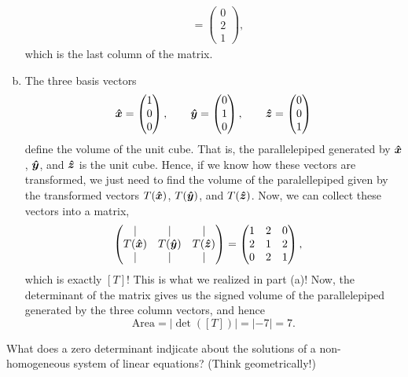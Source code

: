 \documentclass[12pt]{article} %
\begin{document}
\begin{solution}
\begin{enumerate}[(a)]
\begin{align*}
&= \begin{pmatrix} 0 \\ 2 \\ 1 \end{pmatrix},
    \end{align*}
    which is the last column of the matrix.
    \item The three basis vectors 
    \[
    \boldsymbol{\hat{x}} = \begin{pmatrix} 1 \\ 0 \\ 0 \end{pmatrix}, \qquad \boldsymbol{\hat{y}} = \begin{pmatrix} 0 \\ 1 \\ 0 \end{pmatrix}, \qquad \boldsymbol{\hat{z}} =\begin{pmatrix} 0 \\ 0 \\ 1 \end{pmatrix}
    \]
    define the volume of the unit cube. That is, the parallelepiped generated by $\boldsymbol{\hat{x}}$, $\boldsymbol{\hat{y}}$, and $\boldsymbol{\hat{z}}$ is the unit cube. Hence, if we know how these vectors are transformed, we just need to find the volume of the paralellepiped given by the transformed vectors $T(\boldsymbol{\hat{x}})$, $T(\boldsymbol{\hat{y}})$, and $T(\boldsymbol{\hat{z}})$.  Now, we can collect these vectors into a matrix,
    \begin{align*}
    \begin{pmatrix} \vert & \vert & \vert \\ T(\boldsymbol{\hat{x}}) & T(\boldsymbol{\hat{y}}) & T(\boldsymbol{\hat{z}}) \\ \vert & \vert & \vert \end{pmatrix} &= \begin{pmatrix}  1& 2& 0\\
2& 1& 2\\
0& 2& 1\end{pmatrix},
    \end{align*}
    which is exactly $[T]$! This is what we realized in part (a)! Now, the determinant of the matrix gives us the signed volume of the parallelepiped generated by the three column vectors, and hence
    \[
    \mathrm{Area}=|\det([T])|=|-7|=7.
    \]
\end{enumerate}
\end{solution}

\newpage
\begin{problem}
What does a zero determinant indjicate about the solutions of a non-homogeneous system of linear equations? (Think geometrically!)
\end{problem}
\end{document}
